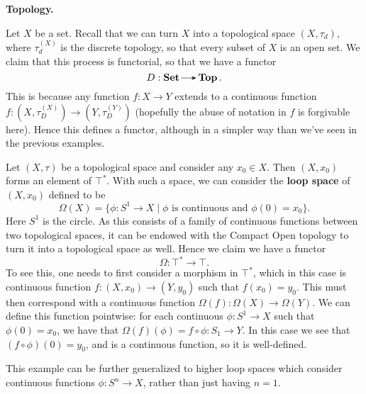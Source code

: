     \vspace{0.5cm}
    {\large\noindent \textbf{Topology.}\par}

    \begin{example}
        Let $X$ be a set. Recall that we can turn $X$ into a topological space 
        $(X,\tau_d)$, where $\tau^{(X)}_{d}$ is the discrete topology, so that every subset of 
        $X$ is an open set. We claim that this process is functorial, so that we 
        have a functor
        \[
            D: \Set \to \top.
        \]
        This is because any function $f: X \to Y$ extends 
        to a continuous function $f: (X, \tau^{(X)}_{D}) \to (Y, \tau^{(Y)}_D)$ 
        (hopefully the abuse of notation in $f$ is forgivable here).
        Hence this defines a functor, although in a simpler way than we've seen in the 
        previous examples. 
    \end{example}
    
    \begin{example}
        Let $(X, \tau)$ be a topological space and consider any $x_0 \in X$. 
        Then $(X, x_0)$ forms an element of $\top^*$.  With such a space, we can 
        consider the \textbf{loop space} of $(X, x_0)$ defined to be 
        \[
            \Omega(X) = \{\phi: S^1 \to X \mid \phi \text{ is continuous and } \phi(0) = x_0\}. 
        \]
        Here $S^1$ is the circle. 
        As this consists of a family of continuous functions between two topological spaces, 
        it can be endowed with the Compact Open topology to turn it into a topological space as well.
        Hence we claim we have a functor 
        \[
            \Omega: \top^* \to \top.
        \]
        To see this, one needs to first consider a morphism in $\top^*$, which 
        in this case is continuous function $f: (X, x_0) \to (Y, y_0)$  such that 
        $f(x_0 )= y_0$. This must then correspond with a continuous function 
        $\Omega(f): \Omega(X) \to \Omega(Y)$. We can define this function 
        pointwise: for each continuous $\phi: S^1 \to X$ such that $\phi(0) = x_0$, we have that 
        $\Omega(f)(\phi) = f \circ \phi: S_1 \to Y$. In this case we see that $(f \circ \phi)(0) = y_0$, 
        and is a continuous function, so it is well-defined. 

        This example can be further generalized to higher loop spaces which consider continuous 
        functions $\phi: S^n \to X$, rather than just having $n = 1$. 
    \end{example}

